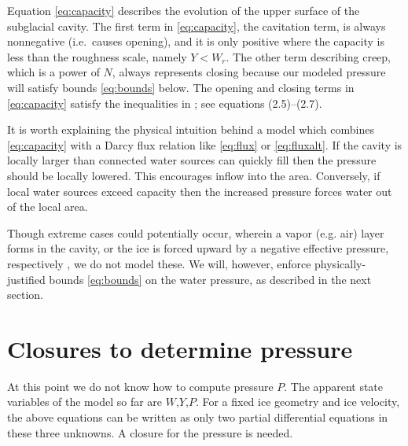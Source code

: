 \documentclass[11pt,final]{amsart}%
\begin{document}
Equation \eqref{eq:capacity} describes the evolution of the upper surface of the subglacial cavity.  The first term in \eqref{eq:capacity}, the cavitation term, is always nonnegative (i.e.~causes opening), and it is only positive where the capacity is less than the roughness scale, namely $Y<W_r$.  The other term describing creep, which is a power of $N$, always represents closing because our modeled pressure will satisfy bounds \eqref{eq:bounds} below.  The opening and closing terms in \eqref{eq:capacity} satisfy the inequalities in \cite{Schoofetal2012}; see equations (2.5)--(2.7).

It is worth explaining the physical intuition behind a model which combines \eqref{eq:capacity} with a Darcy flux relation like \eqref{eq:flux} or \eqref{eq:fluxalt}.  If the cavity is locally larger than connected water sources can quickly fill then the pressure should be locally lowered.  This encourages inflow into the area.  Conversely, if local water sources exceed capacity then the increased pressure forces water out of the local area.

Though extreme cases could potentially occur, wherein a vapor (e.g. air) layer forms in the cavity, or the ice is forced upward by a negative effective pressure, respectively \citep{Schoofetal2012}, we do not model these.  We will, however, enforce physically-justified bounds \eqref{eq:bounds} on the water pressure, as described in the next section.


\section{Closures to determine pressure} \label{sec:closures}

At this point we do not know how to compute pressure $P$.  The apparent state variables of the model so far are $W$,$Y$,$P$.  For a fixed ice geometry and ice velocity, the above equations can be written as only two partial differential equations in these three unknowns.   A closure for the pressure is needed.
\end{document}
